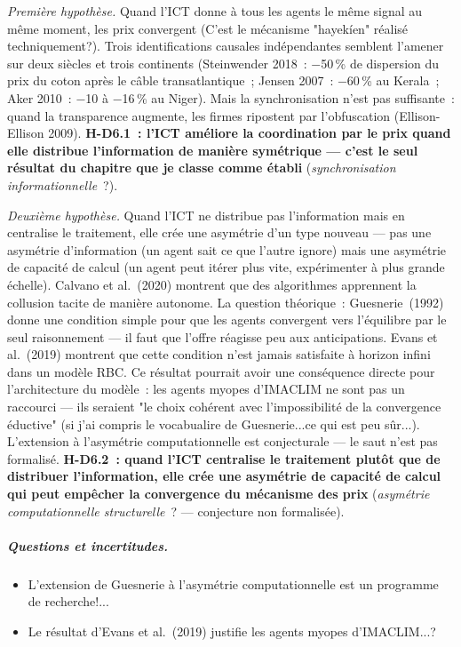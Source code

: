 \emph{Premi\`ere hypoth\`ese.} Quand l'ICT donne \`a tous les agents le m\^eme signal au m\^eme moment, les prix convergent (C'est le m\'ecanisme "hayek\'ien" r\'ealis\'e techniquement?). Trois identifications causales ind\'ependantes semblent l'amener sur deux si\`ecles et trois continents (Steinwender 2018~: $-$50\,\% de dispersion du prix du coton apr\`es le c\^able transatlantique~; Jensen 2007~: $-$60\,\% au Kerala~; Aker 2010~: $-$10 \`a $-$16\,\% au Niger). Mais la synchronisation n'est pas suffisante~: quand la transparence augmente, les firmes ripostent par l'obfuscation (Ellison-Ellison 2009). \textbf{H-D6.1~: l'ICT am\'eliore la coordination par le prix quand elle distribue l'information de mani\`ere sym\'etrique --- c'est le seul r\'esultat du chapitre que je classe comme \'etabli} (\emph{synchronisation informationnelle}~?).

\emph{Deuxi\`eme hypoth\`ese.} Quand l'ICT ne distribue pas l'information mais en centralise le traitement, elle cr\'ee une asym\'etrie d'un type nouveau --- pas une asym\'etrie d'information (un agent sait ce que l'autre ignore) mais une asym\'etrie de capacit\'e de calcul (un agent peut it\'erer plus vite, exp\'erimenter \`a plus grande \'echelle). Calvano et al.~(2020) montrent que des algorithmes apprennent la collusion tacite de mani\`ere autonome. La question th\'eorique~: Guesnerie~(1992) donne une condition simple pour que les agents convergent vers l'\'equilibre par le seul raisonnement --- il faut que l'offre r\'eagisse peu aux anticipations. Evans et al.~(2019) montrent que cette condition n'est jamais satisfaite \`a horizon infini dans un mod\`ele RBC. Ce r\'esultat pourrait avoir une cons\'equence directe pour l'architecture du mod\`ele~: les agents myopes d'IMACLIM ne sont pas un raccourci --- ils seraient "le choix coh\'erent avec l'impossibilit\'e de la convergence \'eductive" (si j'ai compris le vocabualire de Guesnerie...ce qui est peu sûr...). L'extension \`a l'asym\'etrie computationnelle est conjecturale --- le saut n'est pas formalis\'e. \textbf{H-D6.2~: quand l'ICT centralise le traitement plut\^ot que de distribuer l'information, elle cr\'ee une asym\'etrie de capacit\'e de calcul qui peut emp\^echer la convergence du m\'ecanisme des prix} (\emph{asym\'etrie computationnelle structurelle}~? --- conjecture non formalis\'ee).

\subparagraph{Questions et incertitudes.}
\begin{itemize}
\item L'extension de Guesnerie \`a l'asym\'etrie computationnelle est un programme de recherche!...
\item Le r\'esultat d'Evans et al.\ (2019) justifie les agents myopes d'IMACLIM...?
\end{itemize}


